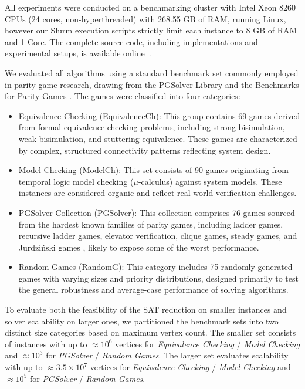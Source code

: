 \documentclass[a4paper,fleqn]{cas-sc}
\begin{document}
All experiments were conducted on a benchmarking cluster with Intel Xeon 8260 CPUs (24 cores, non-hyperthreaded) with 268.55 GB of RAM, running Linux, however our Slurm execution scripts strictly limit each instance to 8 GB of RAM and 1 Core. The complete source code, including implementations and experimental setups, is available online~\citep{Hernandez:Github:NoOpponentCycle:2026}.

We evaluated all algorithms using a standard benchmark set commonly employed in parity game research, drawing from the PGSolver Library \citep{Friedmann:2017} and the Benchmarks for Parity Games \citep{Keiren:2015}. The games were classified into four categories:

\begin{itemize}
    \item Equivalence Checking (\textsf{EquivalenceCh}): This group contains 69 games derived from formal equivalence checking problems, including strong bisimulation, weak bisimulation, and stuttering equivalence. These games are characterized by complex, structured connectivity patterns reflecting system design.
    \item Model Checking (\textsf{ModelCh}): This set consists of 90 games originating from temporal logic model checking ($\mu$-calculus) against system models. These instances are considered organic and reflect real-world verification challenges.
    \item PGSolver Collection (\textsf{PGSolver}): This collection comprises 76 games sourced from the hardest known families of parity games, including ladder games, recursive ladder games, elevator verification, clique games, steady games, and Jurdziński games \citep{Benerecetti:2016}, likely to expose some of the worst performance.
    \item Random Games (\textsf{RandomG}): This category includes 75 randomly generated games with varying sizes and priority distributions, designed primarily to test the general robustness and average-case performance of solving algorithms.
\end{itemize}

To evaluate both the feasibility of the SAT reduction on smaller instances and solver scalability on larger ones, we partitioned the benchmark sets into two distinct size categories based on maximum vertex count. The smaller set consists of instances with up to $\approx 10^6$ vertices for \textit{Equivalence Checking} / \textit{Model Checking} and $\approx 10^3$ for \textit{PGSolver} / \textit{Random Games}. The larger set evaluates scalability with up to $\approx 3.5 \times 10^7$ vertices for \textit{Equivalence Checking} / \textit{Model Checking} and $\approx 10^5$ for \textit{PGSolver} / \textit{Random Games}.
\end{document}
